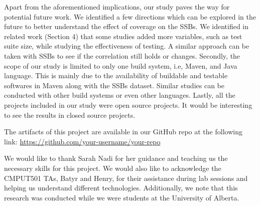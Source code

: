 \documentclass[sigconf,nonacm]{acmart}
\begin{document}
Apart from the aforementioned implications, our study paves the way for potential future work. We identified a few directions which can be explored in the future to better understand the effect of coverage on the SSBs. We identified in related work (Section 4) that some studies added more variables, such as test suite size, while studying the effectiveness of testing. A similar approach can be taken with SSBs to see if the correlation still holds or changes. Secondly, the scope of our study is limited to only one build system, i.e, Maven, and Java language. This is mainly due to the availability of buildable and testable softwares in Maven along with the SSBs dataset. Similar studies can be conducted with other build systems or even other languages. Lastly, all the projects included in our study were open source projects. It would be interesting to see the results in closed source projects.

The artifacts of this project are available in our GitHub repo at the following link:
\href{https://github.com/your-username/your-repo}{https://github.com/your-username/your-repo}

\begin{acks}
	We would like to thank Sarah Nadi for her guidance and teaching us the necessary skills for this project. We would also like to acknowledge the CMPUT501 TAs, Batyr and Henry, for their assistance during lab sessions and helping us understand different technologies. Additionally, we note that this research was conducted while we were students at the University of Alberta.
\end{acks}
\end{document}
